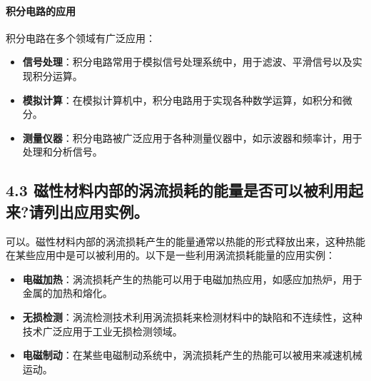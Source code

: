 \documentclass[]{../../templates/Report}%
\begin{document}
\begin{fullreportonly}
\paragraph{积分电路的应用}

积分电路在多个领域有广泛应用：
\begin{itemize}
    \item \textbf{信号处理}：积分电路常用于模拟信号处理系统中，用于滤波、平滑信号以及实现积分运算。
    \item \textbf{模拟计算}：在模拟计算机中，积分电路用于实现各种数学运算，如积分和微分。
    \item \textbf{测量仪器}：积分电路被广泛应用于各种测量仪器中，如示波器和频率计，用于处理和分析信号。
\end{itemize}

\subsection*{4.3 磁性材料内部的涡流损耗的能量是否可以被利用起来?请列出应用实例。}
可以。磁性材料内部的涡流损耗产生的能量通常以热能的形式释放出来，这种热能在某些应用中是可以被利用的。以下是一些利用涡流损耗能量的应用实例：
\begin{itemize}
    \item \textbf{电磁加热}：涡流损耗产生的热能可以用于电磁加热应用，如感应加热炉，用于金属的加热和熔化。
    \item \textbf{无损检测}：涡流检测技术利用涡流损耗来检测材料中的缺陷和不连续性，这种技术广泛应用于工业无损检测领域。
    \item \textbf{电磁制动}：在某些电磁制动系统中，涡流损耗产生的热能可以被用来减速机械运动。
\end{itemize}
\end{fullreportonly}
\insertnotes
\end{document}
